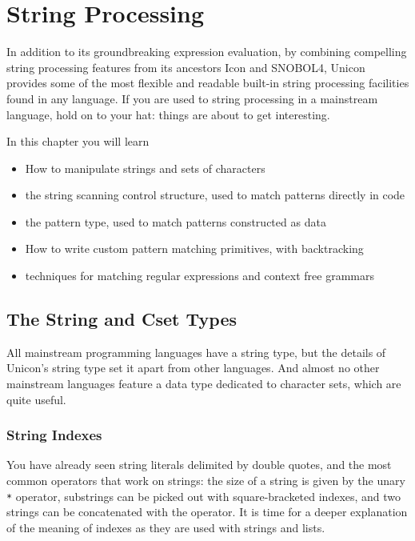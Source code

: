 \chapter{String Processing}

In addition to its groundbreaking expression evaluation, by combining
compelling string processing features from its ancestors Icon and
SNOBOL4, Unicon provides some of the most flexible and
readable built-in string processing facilities found in any language.
If you are used to string processing in a mainstream language, hold on
to your hat: things are about to get interesting.

In this chapter you will learn

\begin{itemize}
\item How to manipulate strings and sets of characters
\item the string scanning control structure,
used to match patterns directly in code
\item the pattern type, used to match patterns constructed as data
\item How to write custom pattern matching
primitives, with backtracking
\item techniques for matching regular expressions and context free grammars
\end{itemize}

\section{The String and Cset Types}

All mainstream programming languages have a string type, but the
details of Unicon's string type set it apart from other languages.
And almost no other mainstream languages feature a data type
dedicated to character sets, which are quite useful.

\subsection{String Indexes}

You have already seen string literals delimited by double quotes, and
the most common operators that work on strings: the size of a string is
given by the unary \texttt{*} operator, substrings can be picked out
with square-bracketed indexes, and two strings can be concatenated with the
\texttt{{\textbar}{\textbar}} operator. It is time for a
deeper explanation of the meaning of indexes as they are used with
strings and lists.

